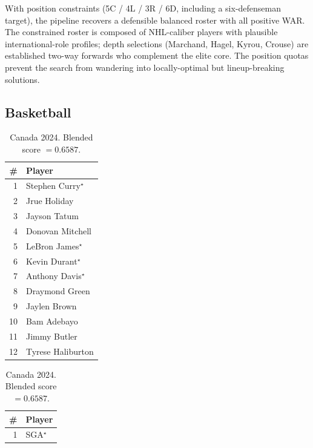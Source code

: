 \documentclass[11pt,letterpaper]{article}
\begin{document}
With position constraints (5C / 4L / 3R / 6D, including a six-defenseman
target), the pipeline recovers a defensible balanced roster with all
positive WAR. The constrained roster is composed of NHL-caliber players
with plausible international-role profiles; depth selections
(Marchand, Hagel, Kyrou, Crouse) are established two-way forwards who
complement the elite core. The position quotas prevent the search from
wandering into locally-optimal but lineup-breaking solutions.

\subsection{Basketball}

\begin{table}[htbp]
  \centering \small
  \begin{minipage}{0.45\textwidth}
    \centering
    \caption*{USA 2024. Blended score $= 0.7418$.}
    \begin{tabular}{r l}
      \toprule
      \# & Player \\
      \midrule
      1  & Stephen Curry$^{\star}$       \\
      2  & Jrue Holiday                  \\
      3  & Jayson Tatum                  \\
      4  & Donovan Mitchell              \\
      5  & LeBron James$^{\star}$       \\
      6  & Kevin Durant$^{\star}$       \\
      7  & Anthony Davis$^{\star}$      \\
      8  & Draymond Green                \\
      9  & Jaylen Brown                  \\
      10 & Bam Adebayo                   \\
      11 & Jimmy Butler                  \\
      12 & Tyrese Haliburton             \\
      \bottomrule
    \end{tabular}
  \end{minipage}%
  \hfill
  \begin{minipage}{0.45\textwidth}
    \centering
    \caption*{Canada 2024. Blended score $= 0.6587$.}
    \begin{tabular}{r l}
      \toprule
      \# & Player \\
      \midrule
      1  & SGA$^{\star}$                    \\

\end{tabular}
\end{minipage}
\end{table}
\end{document}
